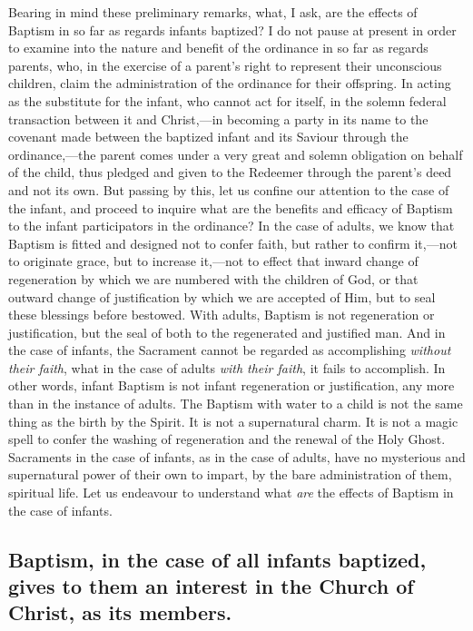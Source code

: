 \documentclass[english,]{book}
\begin{document}
Bearing in mind these preliminary remarks, what, I ask, are the effects of Baptism in so far as regards infants baptized? I do not pause at present in order to examine into the nature and benefit of the ordinance in so far as regards parents, who, in the exercise of a parent's right to represent their unconscious children, claim the administration of the ordinance for their offspring. In acting as the substitute for the infant, who cannot act for itself, in the solemn federal transaction between it and Christ,---in becoming a party in its name to the covenant made between the baptized infant and its Saviour through the ordinance,---the parent comes under a very great and solemn obligation on behalf of the child, thus pledged and given to the Redeemer through the parent's deed and not its own. But passing by this, let us confine our attention to the case of the infant, and proceed to inquire what are the benefits and efficacy of Baptism to the infant participators in the ordinance? In the case of adults, we know that Baptism is fitted and designed not to confer faith, but rather to confirm it,---not to originate grace, but to increase it,---not to effect that inward change of regeneration by which we are numbered with the children of God, or that outward change of justification by which we are accepted of Him, but to seal these blessings before bestowed. With adults, Baptism is not regeneration or justification, but the seal of both to the regenerated and justified man. And in the case of infants, the Sacrament cannot be regarded as accomplishing \emph{without their faith}, what in the case of adults \emph{with their faith}, it fails to accomplish. In other words, infant Baptism is not infant regeneration or justification, any more than in the instance of adults. The Baptism with water to a child is not the same thing as the birth by the Spirit. It is not a supernatural charm. It is not a magic spell to confer the washing of regeneration and the renewal of the Holy Ghost. Sacraments in the case of infants, as in the case of adults, have no mysterious and supernatural power of their own to impart, by the bare administration of them, spiritual life. Let us endeavour to understand what \emph{are} the effects of Baptism in the case of infants.

\hypertarget{baptism-in-the-case-of-all-infants-baptized-gives-to-them-an-interest-in-the-church-of-christ-as-its-members.}{%
\subsection{Baptism, in the case of all infants baptized, gives to them an interest in the Church of Christ, as its members.}\label{baptism-in-the-case-of-all-infants-baptized-gives-to-them-an-interest-in-the-church-of-christ-as-its-members.}}
\end{document}
